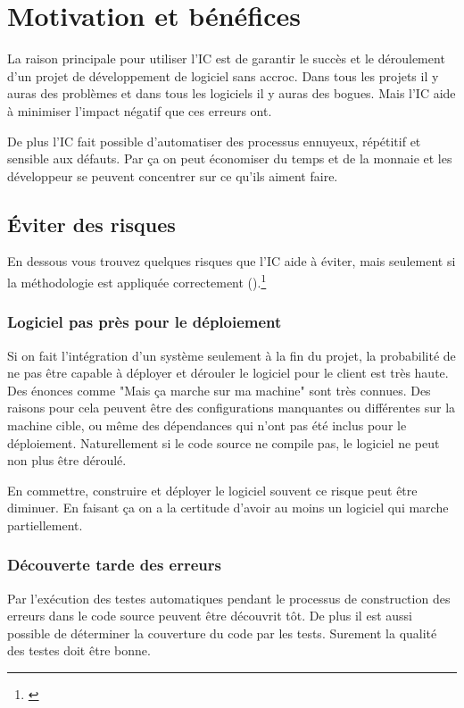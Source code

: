 \clearpage

\section{Motivation et bénéfices}

La raison principale pour utiliser l'IC est de garantir le succès et le déroulement d'un projet de développement de logiciel sans accroc. Dans tous les projets il y auras des problèmes et dans tous les logiciels il y auras des bogues. Mais l'IC aide à minimiser l'impact négatif que ces erreurs ont.

De plus l'IC fait possible d'automatiser des processus ennuyeux, répétitif et sensible aux défauts. Par ça on peut économiser du temps et de la monnaie et les développeur se peuvent concentrer sur ce qu'ils aiment faire.

\subsection{Éviter des risques}
En dessous vous trouvez quelques risques que l'IC aide à éviter, mais seulement si la méthodologie est appliquée correctement ().\footnote{\cite[p39]{duvallconint}} 
\subsubsection{Logiciel pas près pour le déploiement}
Si on fait l'intégration d'un système seulement à la fin du projet, la probabilité de ne pas être capable à déployer et dérouler le logiciel pour le client est très haute. Des énonces comme "Mais ça marche sur ma machine" sont très connues. Des raisons pour cela peuvent être des configurations manquantes ou différentes sur la machine cible, ou même des dépendances qui n'ont pas été inclus pour le déploiement. Naturellement si le code source ne compile pas, le logiciel ne peut non plus être déroulé.

En commettre, construire et déployer le logiciel souvent ce risque peut être diminuer. En faisant ça on a la certitude d'avoir au moins un logiciel qui marche partiellement.
\subsubsection{Découverte tarde des erreurs}
Par l'exécution des testes automatiques pendant le processus de construction des erreurs dans le code source peuvent être découvrit tôt. De plus il est aussi possible de déterminer la couverture du code par les tests. Surement la qualité des testes doit être bonne.
